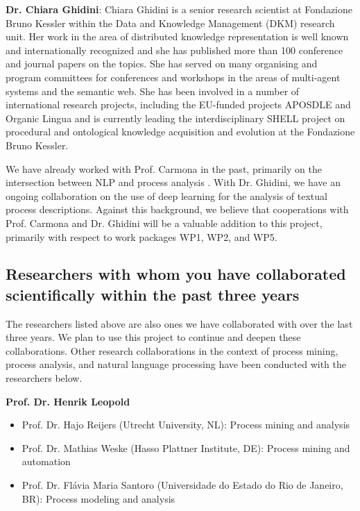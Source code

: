 \textbf{Dr. Chiara Ghidini}: Chiara Ghidini is a senior research scientist at Fondazione Bruno Kessler within the Data and Knowledge Management (DKM) research unit. Her work in the area of distributed knowledge representation is well known and internationally recognized and she has published more than 100 conference and journal papers on the topics. She has served on many organising and program committees for conferences and workshops in the areas of multi-agent systems and the semantic web. She has been involved in a number of international research projects, including the EU-funded projects APOSDLE and Organic Lingua and is currently leading the interdisciplinary SHELL project on procedural and ontological knowledge acquisition and evolution at the Fondazione Bruno Kessler. 

We have already worked with Prof. Carmona in the past, primarily on the intersection between NLP and process analysis \cite{sanchez2018aligning,van2018challenges}.  With Dr. Ghidini, we have an ongoing collaboration on the use of deep learning for the analysis of textual process descriptions. 
Against this background, we believe that cooperations with Prof. Carmona and Dr. Ghidini will be a valuable addition to this project, primarily with respect to work packages WP1, WP2, and WP5. 

\subsection{Researchers with whom you have collaborated scientifically within the past three years}


The researchers listed above are also ones we have collaborated with over the last three years. We plan to use this project to continue and deepen these collaborations. Other research collaborations in the context of process mining, process analysis, and natural language processing have been conducted with the researchers below.

\textbf{Prof. Dr. Henrik Leopold}

\begin{itemize}
\item Prof. Dr. Hajo Reijers (Utrecht University, NL): Process mining and analysis
\item Prof. Dr. Mathias Weske (Hasso Plattner Institute, DE): Process mining and automation
\item Prof. Dr. Flávia Maria Santoro (Universidade do Estado do Rio de Janeiro, BR): Process modeling and analysis
\end{itemize}

